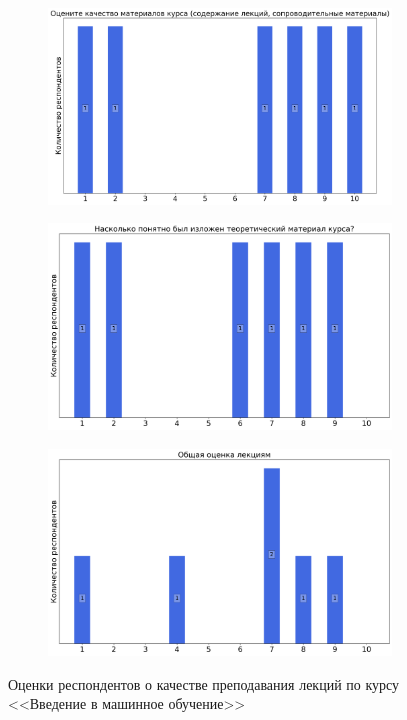 \begin{figure}[H]
\begin{subfigure}[b]{0.45\textwidth}
			\end{subfigure}
			\begin{subfigure}[b]{0.45\textwidth}
				\centering
				\includegraphics[width=\textwidth]{images/4 course/Введение в машинное обучение/lecturer-marks-Воронцов К.В.-1.png}
			\end{subfigure}
			\begin{subfigure}[b]{0.45\textwidth}
				\centering
				\includegraphics[width=\textwidth]{images/4 course/Введение в машинное обучение/lecturer-marks-Воронцов К.В.-2.png}
			\end{subfigure}	
			\begin{subfigure}[b]{0.45\textwidth}
				\centering
				\includegraphics[width=\textwidth]{images/4 course/Введение в машинное обучение/lecturer-marks-Воронцов К.В.-3.png}
			\end{subfigure}
			\caption{Оценки респондентов о качестве преподавания лекций по курсу <<Введение в машинное обучение>>}
		\end{figure}

